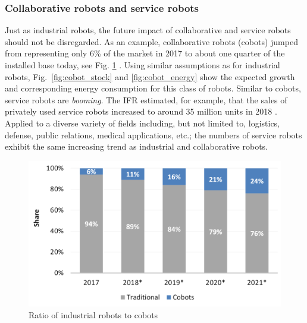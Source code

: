 \subsubsection{Collaborative robots and service robots}
Just as industrial robots, the future impact of collaborative and service robots should not be disregarded. As an example, collaborative robots (cobots) jumped from representing only 6\% of the market in 2017 to about one quarter of the installed base today, see Fig. \ref{fig:industrial_cobot_share} \cite{tobe2015}. Using similar assumptions as for industrial robots, Fig.~\ref{fig:cobot_stock} and \ref{fig:cobot_energy} show the expected growth and corresponding energy consumption for this class of robots. Similar to cobots, service robots are \textit{booming}. The IFR estimated, for example, that the sales of privately used service robots increased to around 35 million units in 2018 \cite{IFR2015}. Applied to a diverse variety of fields including, but not limited to, logistics, defense, public relations, medical applications, etc.; the numbers of service robots exhibit the same increasing trend as industrial and collaborative robots.
\begin{figure}[!t]
	\centering
    \includegraphics[width= 0.9\columnwidth]{fig/share_industrial_and_cobots} 
	\caption{Ratio of industrial robots to cobots \cite{statista_ir_cobot_share}}
    \label{fig:industrial_cobot_share}
\end{figure}
